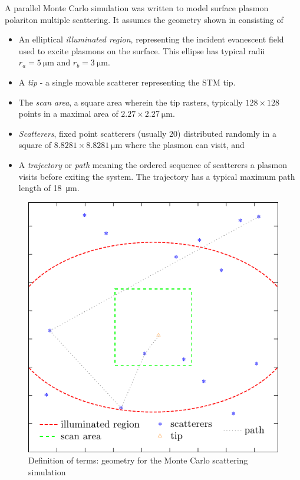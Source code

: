A parallel Monte Carlo simulation was written to model surface plasmon
polariton multiple scattering.
It assumes the geometry shown in  consisting of
\begin{itemize}
\item An elliptical {\it illuminated region}, representing the incident evanescent
field used to excite plasmons on the surface.  This ellipse has 
typical radii $r_a=\SI{5}{\micro\meter}$ and $r_b=\SI{3}{\micro\meter}$.  
\item A {\it tip} - a single movable scatterer representing the STM tip.
\item The {\it scan area}, a square area wherein the tip rasters, typically
$128\times128$ points in a maximal area of $2.27\times\SI{2.27}{\micro\meter}$.  
\item {\it Scatterers}, fixed point scatterers (usually \num{20})
distributed randomly in a square of $8.8281\times\SI{8.8281}{\micro\meter}$
where the plasmon can visit, and
\item A {\it trajectory} or {\it path} meaning the ordered sequence of scatterers a
plasmon visits before exiting the system.  The trajectory has a typical maximum
path length of \SI{18}{\micro\meter}.
\end{itemize}
\begin{figure}
\centering
\includegraphics[keepaspectratio]{scatteringmicro/figures/montecarlogeo.pdf}
\caption{Definition of terms: geometry for the Monte Carlo scattering
simulation}
\label{fig:plasmongeo}
\end{figure}

